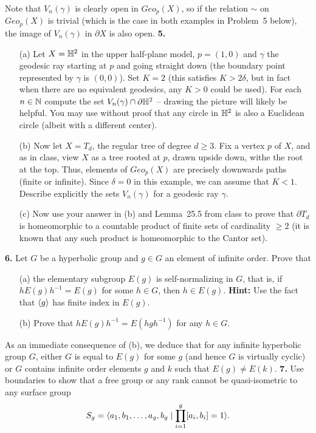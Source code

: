 \documentclass[12pt]{amsart}
\begin{document}
Note that $V_{n}(\gamma)$ is clearly open in $Geo_p(X)$, so if the relation $\sim$ on $Geo_p(X)$ is trivial (which is the case in both examples in Problem~5 below), the image of $V_n(\gamma)$ in $\partial X$ is also open.
\skv
{\bf 5.}
\begin{itemize} 
\item[(a)] Let $X={\mathbb H}^2$ in the upper half-plane model, $p=(1,0)$ and $\gamma$ the geodesic ray starting at $p$ and going straight down (the boundary point represented by $\gamma$ is $(0,0)$). Set $K=2$ (this satisfies $K>2\delta$, but in fact when there are no equivalent geodesics,
any $K>0$ could be used). For each $n\in{\mathbb N}$ compute the set $V_n(\gamma)\cap \partial {\mathbb H}^2$ -- drawing the picture will likely be helpful.
You may use without proof that any circle in ${\mathbb H}^2$ is also a Euclidean circle (albeit with a different center).

\item[(b)] Now let $X=T_d$, the regular tree of degree $d\geq 3$. Fix a vertex $p$ of $X$, and as in class, view $X$ as a tree rooted at $p$,
drawn upside down, withe the root at the top. Thus, elements of $Geo_p(X)$ are precisely downwards paths (finite or infinite). 
Since $\delta=0$ in this example, we can assume that $K<1$. Describe explicitly the sets $V_n(\gamma)$ for a geodesic ray $\gamma$.

\item[(c)] Now use your answer in (b) and Lemma~25.5 from class to prove that $\partial T_d$ is homeomorphic to a countable product of finite sets of cardinality $\geq 2$ (it is known that any such product is homeomorphic to the Cantor set).
\end{itemize}
\skv
{\bf 6.} Let $G$ be a hyperbolic group and $g\in G$ an element of infinite order. Prove that 
\begin{itemize}
\item[(a)] the elementary subgroup $E(g)$ is self-normalizing in $G$, that is, if $hE(g)h^{-1}=E(g)$ for some $h\in G$, then $h\in E(g)$. 
{\bf Hint:} Use the fact that ${\langle} g{\rangle}$ has finite index in $E(g)$.
\item[(b)] Prove that $hE(g)h^{-1}=E(hgh^{-1})$ for any $h\in G$.
\end{itemize}
As an immediate consequence of (b), we deduce that for any infinite hyperbolic group $G$, either $G$ is equal to $E(g)$ for some $g$
(and hence $G$ is virtually cyclic) or $G$ contains infinite order elements $g$ and $k$ such that $E(g)\neq E(k)$.
\skv
{\bf 7.} Use boundaries to show that a free group or any rank cannot be quasi-isometric to any surface group 
$$S_g={\langle} a_1,b_1,\ldots, a_g, b_g \mid \prod_{i=1}^g [a_i,b_i]=1{\rangle}.$$
\end{document}
